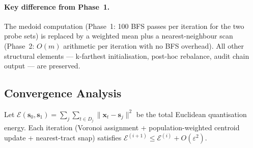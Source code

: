 \paragraph{Key difference from Phase~1.}
The medoid computation (Phase~1: 100 BFS passes per iteration for the two
probe sets) is replaced by a weighted mean plus a nearest-neighbour scan
(Phase~2: $O(m)$ arithmetic per iteration with no BFS overhead).
All other structural elements --- k-farthest initialisation,
post-hoc rebalance, audit chain output --- are preserved.

\subsection{Convergence Analysis}

\begin{proposition}
\label{prop:geo-convergence}
Let $\mathcal{E}(\mathbf{s}_0, \mathbf{s}_1)
= \sum_{j} \sum_{t \in D_j} \|\mathbf{x}_t - \mathbf{s}_j\|^2$
be the total Euclidean quantisation energy.
Each iteration (Voronoi assignment + population-weighted centroid update +
nearest-tract snap) satisfies
$\mathcal{E}^{(i+1)} \le \mathcal{E}^{(i)} + O(\varepsilon^2)$.
\end{proposition}

